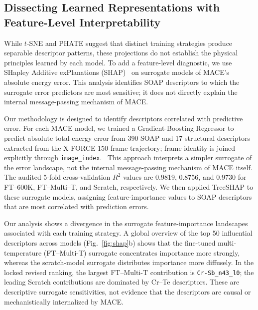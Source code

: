 \documentclass[pdflatex,sn-mathphys-num]{sn-jnl}%
\providecommand{\reviewermap}[3]{}
\theoremstyle{thmstyleone}%
\theoremstyle{thmstyletwo}%
\theoremstyle{thmstylethree}%
\begin{document}
\subsection{Dissecting Learned Representations with Feature-Level Interpretability}

While $t$-SNE and PHATE suggest that distinct training strategies produce separable descriptor patterns, these projections do not establish the physical principles learned by each model. To add a feature-level diagnostic, we use SHapley Additive exPlanations (SHAP)~\cite{lundberg_unified_2017} on surrogate models of MACE's absolute energy error. This analysis identifies SOAP descriptors to which the surrogate error predictors are most sensitive; it does not directly explain the internal message-passing mechanism of MACE.

\reviewermap{REV-A6/REV-C13}{done-local}{SHAP explains surrogate error predictions, not MACE internals directly; current 5-fold CV R2 values are 0.9819, 0.8756, and 0.9730. The X-FORCE three-model lineage is recorded in the release audit.}

Our methodology is designed to identify descriptors correlated with predictive error. For each MACE model, we trained a Gradient-Boosting Regressor to predict absolute total-energy error from 390 SOAP and 17 structural descriptors extracted from the X-FORCE 150-frame trajectory; frame identity is joined explicitly through \texttt{image\_index}.~\cite{bartok2012representing} This approach interprets a simpler surrogate of the error landscape, not the internal message-passing mechanism of MACE itself. The audited 5-fold cross-validation $R^2$ values are 0.9819, 0.8756, and 0.9730 for FT--600K, FT--Multi--T, and Scratch, respectively. We then applied TreeSHAP to these surrogate models, assigning feature-importance values to SOAP descriptors that are most correlated with prediction errors.


Our analysis shows a divergence in the surrogate feature-importance landscapes associated with each training strategy. A global overview of the top 50 influential descriptors across models (Fig.~\ref{fig:shap}b) shows that the fine-tuned multi-temperature (FT--Multi-T) surrogate concentrates importance more strongly, whereas the scratch-model surrogate distributes importance more diffusely. In the locked revised ranking, the largest FT--Multi-T contribution is \texttt{Cr-Sb\_n43\_l0}; the leading Scratch contributions are dominated by Cr--Te descriptors. These are descriptive surrogate sensitivities, not evidence that the descriptors are causal or mechanistically internalized by MACE.
\end{document}
